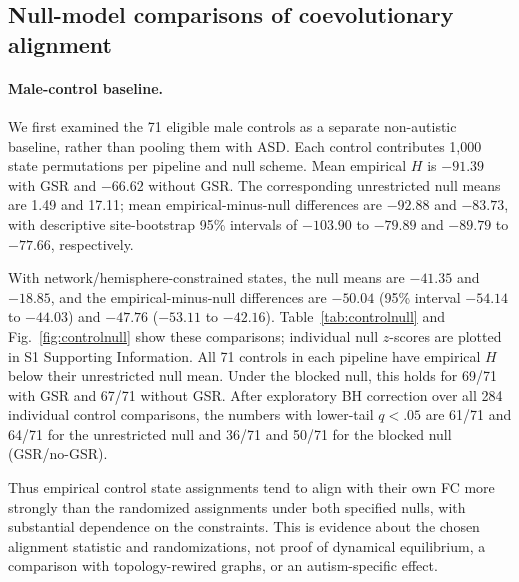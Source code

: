\documentclass[10pt,letterpaper]{article}
\begin{document}


\subsection*{Null-model comparisons of coevolutionary alignment}
\paragraph*{Male-control baseline.}
We first examined the 71 eligible male controls as a separate non-autistic
baseline, rather than pooling them with ASD. Each control contributes 1,000
state permutations per pipeline and null scheme. Mean empirical $H$ is $-91.39$
with GSR and $-66.62$ without GSR. The corresponding unrestricted null means
are 1.49 and 17.11; mean empirical-minus-null differences are $-92.88$ and
$-83.73$, with descriptive site-bootstrap 95\% intervals of $-103.90$ to
$-79.89$ and $-89.79$ to $-77.66$, respectively.

With network/hemisphere-constrained states, the null means are $-41.35$ and
$-18.85$, and the empirical-minus-null differences are $-50.04$ (95\% interval
$-54.14$ to $-44.03$) and $-47.76$ ($-53.11$ to $-42.16$).
Table~\ref{tab:controlnull} and Fig.~\ref{fig:controlnull} show these comparisons;
individual null $z$-scores are plotted in S1 Supporting Information.
All 71 controls in each pipeline have empirical $H$ below their unrestricted
null mean. Under the blocked null, this holds for 69/71 with GSR and 67/71
without GSR. After exploratory BH correction over all 284 individual control
comparisons, the numbers with lower-tail $q<.05$ are 61/71 and 64/71 for the
unrestricted null and 36/71 and 50/71 for the blocked null (GSR/no-GSR).

Thus empirical control state assignments tend to align with their own FC more
strongly than the randomized assignments under both specified nulls, with
substantial dependence on the constraints. This is evidence about the chosen
alignment statistic and randomizations, not proof of dynamical equilibrium,
a comparison with topology-rewired graphs, or an autism-specific effect.


\end{document}
